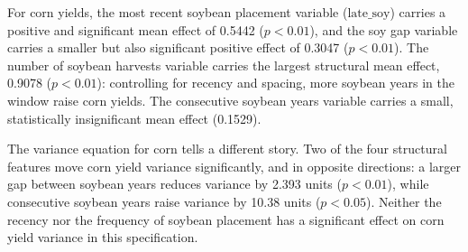 \documentclass[12pt,letterpaper]{article}
\theoremstyle{remark}
\theoremstyle{remark}
\theoremstyle{plain}
\theoremstyle{definition}
\begin{document}
For corn yields, the most recent soybean placement variable ($\text{late\_soy}$) carries a positive and significant mean effect of 0.5442 ($p<0.01$), and the soy gap variable carries a smaller but also significant positive effect of 0.3047 ($p<0.01$). The number of soybean harvests variable carries the largest structural mean effect, 0.9078 ($p<0.01$): controlling for recency and spacing, more soybean years in the window raise corn yields. The consecutive soybean years variable carries a small, statistically insignificant mean effect (0.1529).

The variance equation for corn tells a different story. Two of the four structural features move corn yield variance significantly, and in opposite directions: a larger gap between soybean years reduces variance by 2.393 units ($p<0.01$), while consecutive soybean years raise variance by 10.38 units ($p<0.05$). Neither the recency nor the frequency of soybean placement has a significant effect on corn yield variance in this specification.
 
\end{document}
